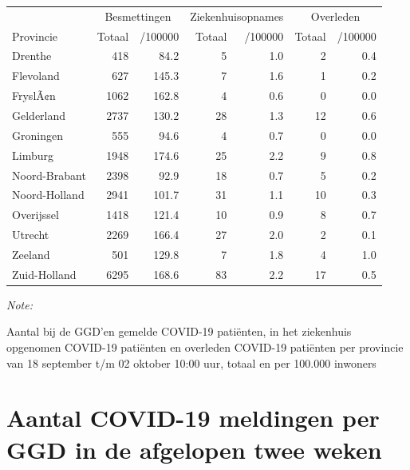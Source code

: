 \documentclass[
  english,
  man,floatsintext]{apa6}
\begin{document}
\begin{table}
\centering
\begin{threeparttable}
\begin{tabular}{lrrrrrr}
\toprule
\multicolumn{1}{c}{ } & \multicolumn{2}{c}{Besmettingen} & \multicolumn{2}{c}{Ziekenhuisopnames} & \multicolumn{2}{c}{Overleden} \\
\cmidrule(l{3pt}r{3pt}){2-3} \cmidrule(l{3pt}r{3pt}){4-5} \cmidrule(l{3pt}r{3pt}){6-7}
Provincie & Totaal & /100000 & Totaal & /100000 & Totaal & /100000\\
\midrule
Drenthe & 418 & 84.2 & 5 & 1.0 & 2 & 0.4\\
Flevoland & 627 & 145.3 & 7 & 1.6 & 1 & 0.2\\
FryslÃ¢n & 1062 & 162.8 & 4 & 0.6 & 0 & 0.0\\
Gelderland & 2737 & 130.2 & 28 & 1.3 & 12 & 0.6\\
Groningen & 555 & 94.6 & 4 & 0.7 & 0 & 0.0\\
Limburg & 1948 & 174.6 & 25 & 2.2 & 9 & 0.8\\
Noord-Brabant & 2398 & 92.9 & 18 & 0.7 & 5 & 0.2\\
Noord-Holland & 2941 & 101.7 & 31 & 1.1 & 10 & 0.3\\
Overijssel & 1418 & 121.4 & 10 & 0.9 & 8 & 0.7\\
Utrecht & 2269 & 166.4 & 27 & 2.0 & 2 & 0.1\\
Zeeland & 501 & 129.8 & 7 & 1.8 & 4 & 1.0\\
Zuid-Holland & 6295 & 168.6 & 83 & 2.2 & 17 & 0.5\\
\bottomrule
\end{tabular}
\begin{tablenotes}
\item \textit{Note: } 
\item Aantal bij de GGD’en gemelde COVID-19 patiënten, in het ziekenhuis opgenomen COVID-19 patiënten en overleden COVID-19 patiënten per provincie van 18 september t/m 02 oktober 10:00 uur, totaal en per 100.000 inwoners
\end{tablenotes}
\end{threeparttable}
\end{table}

\newpage

\hypertarget{aantal-covid-19-meldingen-per-ggd-in-de-afgelopen-twee-weken}{%
\section{Aantal COVID-19 meldingen per GGD in de afgelopen twee weken}\label{aantal-covid-19-meldingen-per-ggd-in-de-afgelopen-twee-weken}}
\end{document}
